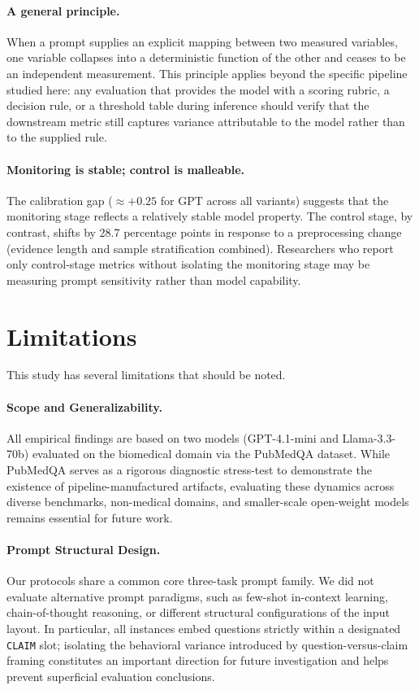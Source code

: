 \documentclass[11pt]{article}
\begin{document}
\paragraph{A general principle.} When a prompt supplies an explicit mapping between two measured variables, one variable collapses into a deterministic function of the other and ceases to be an independent measurement. This principle applies beyond the specific pipeline studied here: any evaluation that provides the model with a scoring rubric, a decision rule, or a threshold table during inference should verify that the downstream metric still captures variance attributable to the model rather than to the supplied rule.

\paragraph{Monitoring is stable; control is malleable.} The calibration gap ($\approx +0.25$ for GPT across all variants) suggests that the monitoring stage reflects a relatively stable model property. The control stage, by contrast, shifts by 28.7 percentage points in response to a preprocessing change (evidence length and sample stratification combined). Researchers who report only control-stage metrics without isolating the monitoring stage may be measuring prompt sensitivity rather than model capability.

\section{Limitations}

This study has several limitations that should be noted.

\paragraph{Scope and Generalizability.} All empirical findings are based on two models (GPT-4.1-mini and Llama-3.3-70b) evaluated on the biomedical domain via the PubMedQA dataset. While PubMedQA serves as a rigorous diagnostic stress-test to demonstrate the existence of pipeline-manufactured artifacts, evaluating these dynamics across diverse benchmarks, non-medical domains, and smaller-scale open-weight models remains essential for future work.

\paragraph{Prompt Structural Design.} Our protocols share a common core three-task prompt family. We did not evaluate alternative prompt paradigms, such as few-shot in-context learning, chain-of-thought reasoning, or different structural configurations of the input layout. In particular, all instances embed questions strictly within a designated \texttt{CLAIM} slot; isolating the behavioral variance introduced by question-versus-claim framing constitutes an important direction for future investigation and helps prevent superficial evaluation conclusions.
\end{document}
